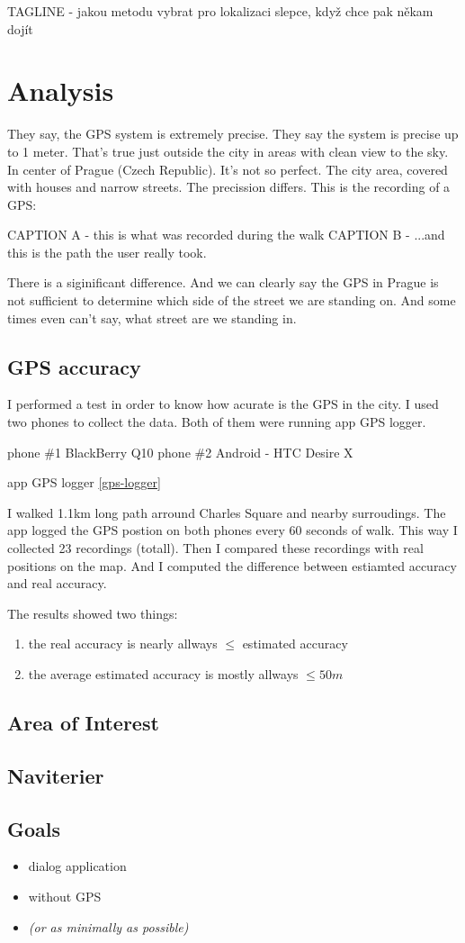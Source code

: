 TAGLINE - jakou metodu vybrat pro lokalizaci slepce, když chce pak někam dojít
	\chapter{Analysis}
	They say, the GPS system is extremely precise. They say the system is precise up to 1 meter. That's true just outside the city in areas with clean view to the sky. In center of Prague (Czech Republic). It's not so perfect. The city area, covered with houses and narrow streets. The precission differs.
	This is the recording of a GPS:
	
	CAPTION A - this is what was recorded during the walk
	CAPTION B - ...and this is the path the user really took.
	
	There is a siginificant difference. And we can clearly say the GPS in Prague is not sufficient to determine which side of the street we are standing on.
	 And some times even can't say, what street are we standing in.
	
	\section{GPS accuracy}
	I performed a test in order to know how acurate is the GPS in the city. I used two phones to collect the data. Both of them were running app GPS logger.
	
	phone \#1  BlackBerry Q10
	phone \#2  Android - HTC Desire X
	
	app		GPS logger \ref{gps-logger}
	
	I walked 1.1km long path arround Charles Square and nearby surroudings. The app logged the GPS postion on both phones every 60 seconds of walk. This way I collected 23 recordings (totall). Then I compared these recordings with real positions on the map. And I computed the difference between estiamted accuracy and real accuracy.
	
	
	The results showed two things:
	\begin{enumerate}
		\item the real accuracy is nearly allways $\leq$ estimated accuracy
		\item the average estimated accuracy is mostly allways $\leq 50m$
	\end{enumerate}
	
	
	
	
	\section{Area of Interest}
	
	\section{Naviterier}
	
	\section{Goals}
		\begin{itemize}
			\item dialog application
			\item without GPS
			\item \emph{ (or as minimally as possible)}
		\end{itemize}